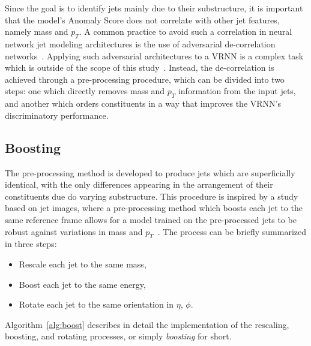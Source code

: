 \documentclass[12pt, a4paper]{article}
\begin{document}
Since the goal is to identify jets mainly due to their substructure, it is important that the model's Anomaly Score does not correlate with other jet features, namely mass and $p_{T}$. A common practice to avoid such a correlation in neural network jet modeling architectures is the use of adversarial de-correlation networks~\cite{adversarial}. Applying such adversarial architectures to a VRNN is a complex task which is outside of the scope of this study~\cite{Purushotham2017VariationalRA}. Instead, the de-correlation is achieved through a pre-processing procedure, which can be divided into two steps: one which directly removes mass and $p_{T}$ information from the input jets, and another which orders constituents in a way that improves the VRNN's discriminatory performance.

\subsection{Boosting}

The pre-processing method is developed to produce jets which are superficially identical, with the only differences appearing in the arrangement of their constituents due do varying substructure. This procedure is inspired by a study based on jet images, where a pre-processing method which boosts each jet to the same reference frame allows for a model trained on the pre-processed jets to be robust against variations in mass and $p_{T}$~\cite{roy2020robust}. The process can be briefly summarized in three steps:

\begin{itemize}
	\item{Rescale each jet to the same mass,}
	\item{Boost each jet to the same energy,}
	\item{Rotate each jet to the same orientation in $\eta$, $\phi$.}
\end{itemize}

Algorithm~\ref{alg:boost} describes in detail the implementation of the rescaling, boosting, and rotating processes, or simply \textit{boosting} for short. 
\end{document}
